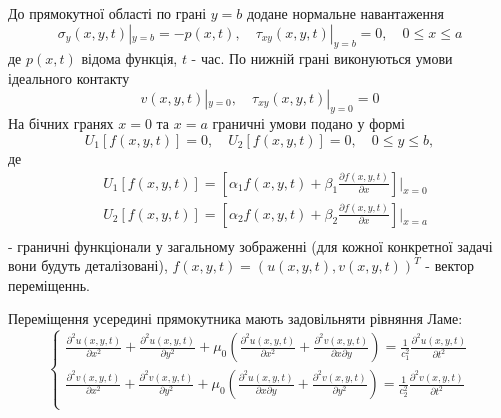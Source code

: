 До прямокутної області по грані $y=b$ додане нормальне навантаження
\begin{equation}
    \sigma_y(x, y, t) |_{y=b} = -p(x, t), \quad  \tau_{xy}(x,y,t) |_{y=b} =0, \quad 0 \le x \le a
\end{equation}
де $p(x, t)$ відома функція, $t$ - час.
По нижній грані виконуються умови ідеального контакту
\begin{equation}
    v(x,y,t) |_{y=0}, \quad \tau_{xy}(x,y,t) |_{y=0} =0
\end{equation}
На бічних гранях $x=0$ та $x=a$ граничні умови подано у формі
\begin{equation}\label{gen_bound_gen}
    U_1[f(x,y,t)]=0, \quad U_2[f(x,y,t)]=0 , \quad 0 \le y \le b,
\end{equation}
де 
\begin{align*}
    &U_1[f(x,y,t)]=\left[\alpha_1f(x,y,t) + \beta_1 \frac{\partial f(x,y,t)}{\partial x} \right]|_{x=0} \\
    &U_2[f(x,y,t)]=\left[\alpha_2f(x,y,t) + \beta_2 \frac{\partial f(x,y,t)}{\partial x} \right]|_{x=a} \\
\end{align*}
- граничні функціонали у загальному зображенні (для кожної конкретної задачі вони будуть деталізовані), $f(x,y,t)=(u(x,y,t), v(x,y,t))^T$ - вектор переміщеннь.

Переміщення усередині прямокутника мають задовільняти рівняння Ламе:
\begin{equation}
    \begin{cases}
        \frac{\partial^2 u(x,y,t)}{\partial x^2} + \frac{\partial^2 u(x,y,t)}{\partial y^2} + \mu_0 (\frac{\partial^2 u(x,y,t)}{\partial x^2} + \frac{\partial^2 v(x,y,t)}{\partial x\partial y}) = \frac{1}{c_1^2} \frac{\partial^2 u(x,y,t)}{\partial t^2} \\
        \frac{\partial^2 v(x,y,t)}{\partial x^2} + \frac{\partial^2 v(x,y,t)}{\partial y^2} + \mu_0 (\frac{\partial^2 u(x,y,t)}{\partial x \partial y} + \frac{\partial^2 v(x,y,t)}{\partial y^2}) = \frac{1}{c_2^2} \frac{\partial^2 v(x,y,t)}{\partial t^2} \\
    \end{cases}
\end{equation}

